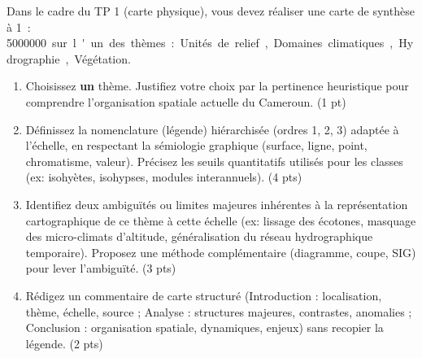 \documentclass[11pt]{article}
\begin{document}
\begin{exercice}
    Dans le cadre du TP 1 (carte physique), vous devez réaliser une carte de synthèse à \SI{1}{:} \SI{5000000} sur l'un des thèmes : Unités de relief, Domaines climatiques, Hydrographie, Végétation.
    \begin{enumerate}
        \item Choisissez \textbf{un} thème. Justifiez votre choix par la pertinence heuristique pour comprendre l'organisation spatiale actuelle du Cameroun. (1 pt)
        \item Définissez la nomenclature (légende) hiérarchisée (ordres 1, 2, 3) adaptée à l'échelle, en respectant la sémiologie graphique (surface, ligne, point, chromatisme, valeur). Précisez les seuils quantitatifs utilisés pour les classes (ex: isohyètes, isohypses, modules interannuels). (4 pts)
        \item Identifiez deux ambiguïtés ou limites majeures inhérentes à la représentation cartographique de ce thème à cette échelle (ex: lissage des écotones, masquage des micro-climats d'altitude, généralisation du réseau hydrographique temporaire). Proposez une méthode complémentaire (diagramme, coupe, SIG) pour lever l'ambiguïté. (3 pts)
        \item Rédigez un commentaire de carte structuré (Introduction : localisation, thème, échelle, source ; Analyse : structures majeures, contrastes, anomalies ; Conclusion : organisation spatiale, dynamiques, enjeux) sans recopier la légende. (2 pts)
    \end{enumerate}
\end{exercice}
\end{document}
